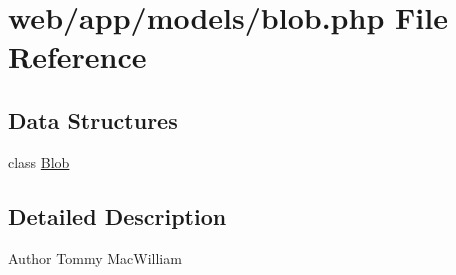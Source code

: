 \hypertarget{blob_8php}{
\section{web/app/models/blob.php File Reference}
\label{blob_8php}
}
\subsection*{Data Structures}
\begin{DoxyCompactItemize}
\item 
class \hyperlink{class_blob}{Blob}
\end{DoxyCompactItemize}


\subsection{Detailed Description}
\begin{DoxyAuthor}{Author}
Tommy MacWilliam 
\end{DoxyAuthor}
